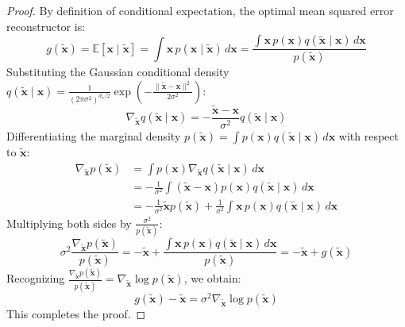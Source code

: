 \documentclass[11pt,a4paper]{article}
\theoremstyle{definition}
\begin{document}
\begin{proof}
By definition of conditional expectation, the optimal mean squared error reconstructor is:
{\boldmath
\begin{equation}
g(\tilde{\mathbf{x}}) = \mathbb{E}[\mathbf{x} \mid \tilde{\mathbf{x}}] = \int \mathbf{x} \, p(\mathbf{x} \mid \tilde{\mathbf{x}}) \, d\mathbf{x} = \frac{\int \mathbf{x} \, p(\mathbf{x}) q(\tilde{\mathbf{x}} \mid \mathbf{x}) \, d\mathbf{x}}{p(\tilde{\mathbf{x}})}
\end{equation}
}
Substituting the Gaussian conditional density $q(\tilde{\mathbf{x}} \mid \mathbf{x}) = \frac{1}{(2\pi \sigma^2)^{d_x/2}} \exp\left(-\frac{\|\tilde{\mathbf{x}} - \mathbf{x}\|^2}{2\sigma^2}\right)$:
{\boldmath
\begin{equation}
\nabla_{\tilde{\mathbf{x}}} q(\tilde{\mathbf{x}} \mid \mathbf{x}) = -\frac{\tilde{\mathbf{x}} - \mathbf{x}}{\sigma^2} q(\tilde{\mathbf{x}} \mid \mathbf{x})
\end{equation}
}
Differentiating the marginal density $p(\tilde{\mathbf{x}}) = \int p(\mathbf{x}) q(\tilde{\mathbf{x}} \mid \mathbf{x}) \, d\mathbf{x}$ with respect to $\tilde{\mathbf{x}}$:
{\boldmath
\begin{align}
\nabla_{\tilde{\mathbf{x}}} p(\tilde{\mathbf{x}}) &= \int p(\mathbf{x}) \nabla_{\tilde{\mathbf{x}}} q(\tilde{\mathbf{x}} \mid \mathbf{x}) \, d\mathbf{x} \\
&= -\frac{1}{\sigma^2} \int (\tilde{\mathbf{x}} - \mathbf{x}) p(\mathbf{x}) q(\tilde{\mathbf{x}} \mid \mathbf{x}) \, d\mathbf{x} \\
&= -\frac{1}{\sigma^2} \tilde{\mathbf{x}} p(\tilde{\mathbf{x}}) + \frac{1}{\sigma^2} \int \mathbf{x} \, p(\mathbf{x}) q(\tilde{\mathbf{x}} \mid \mathbf{x}) \, d\mathbf{x}
\end{align}
}
Multiplying both sides by $\frac{\sigma^2}{p(\tilde{\mathbf{x}})}$:
{\boldmath
\begin{equation}
\sigma^2 \frac{\nabla_{\tilde{\mathbf{x}}} p(\tilde{\mathbf{x}})}{p(\tilde{\mathbf{x}})} = -\tilde{\mathbf{x}} + \frac{\int \mathbf{x} \, p(\mathbf{x}) q(\tilde{\mathbf{x}} \mid \mathbf{x}) \, d\mathbf{x}}{p(\tilde{\mathbf{x}})} = -\tilde{\mathbf{x}} + g(\tilde{\mathbf{x}})
\end{equation}
}
Recognizing $\frac{\nabla_{\tilde{\mathbf{x}}} p(\tilde{\mathbf{x}})}{p(\tilde{\mathbf{x}})} = \nabla_{\tilde{\mathbf{x}}} \log p(\tilde{\mathbf{x}})$, we obtain:
{\boldmath
\begin{equation}
g(\tilde{\mathbf{x}}) - \tilde{\mathbf{x}} = \sigma^2 \nabla_{\tilde{\mathbf{x}}} \log p(\tilde{\mathbf{x}})
\end{equation}
}
This completes the proof.
\end{proof}
\end{document}
